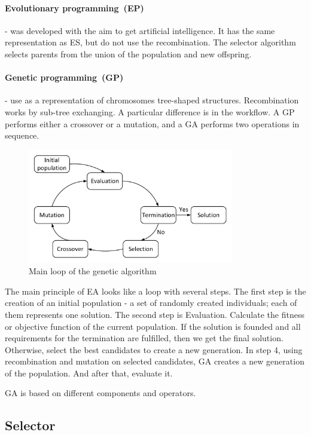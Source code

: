 \paragraph{Evolutionary programming~(EP)} - was developed with the aim to get artificial intelligence\cite{eiben03}. It has the same representation as ES, but do not use the recombination. The selector algorithm selects parents from the union of the population and new offspring.
\paragraph{Genetic programming~(GP)} - use as a representation of chromosomes tree-shaped structures. Recombination works by sub-tree exchanging. A particular difference is in the workflow. A GP performs either a crossover or a mutation, and a GA performs two operations in sequence.

\begin{figure}
	\centering
	\includegraphics[width=0.8\textwidth]{images/GeneticLoop}
	\caption[Main loop of the genetic algorithm]{Main loop of the genetic algorithm}
	\label{fig:GeneticLoop}
\end{figure}

The main principle of EA looks like a loop with several steps.
The first step is the creation of an initial population - a set of randomly created individuals; each of them represents one solution. 
The second step is Evaluation. Calculate the fitness or objective function of the current population.
If the solution is founded and all requirements for the termination are fulfilled, then we get the final solution. Otherwise, select the best candidates to create a new generation.
In step 4, using recombination and mutation on selected candidates, GA creates a new generation of the population. And after that, evaluate it.

GA is based on different components and operators.

\subsection{Selector}\label{sec:GeneticAlgorithm:Selector}

